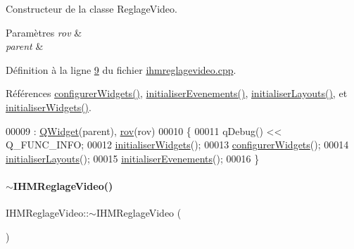 Constructeur de la classe Reglage\+Video. 


\begin{DoxyParams}{Paramètres}
{\em rov} & \\
\hline
{\em parent} & \\
\hline
\end{DoxyParams}


Définition à la ligne \hyperlink{ihmreglagevideo_8cpp_source_l00009}{9} du fichier \hyperlink{ihmreglagevideo_8cpp_source}{ihmreglagevideo.\+cpp}.



Références \hyperlink{ihmreglagevideo_8cpp_source_l00047}{configurer\+Widgets()}, \hyperlink{ihmreglagevideo_8cpp_source_l00105}{initialiser\+Evenements()}, \hyperlink{ihmreglagevideo_8cpp_source_l00061}{initialiser\+Layouts()}, et \hyperlink{ihmreglagevideo_8cpp_source_l00023}{initialiser\+Widgets()}.


\begin{DoxyCode}
00009                                                           : \hyperlink{class_q_widget}{QWidget}(parent), 
      \hyperlink{class_i_h_m_reglage_video_a755736fe361e651453de6bc21725a626}{rov}(rov)
00010 \{
00011     qDebug() << Q\_FUNC\_INFO;
00012     \hyperlink{class_i_h_m_reglage_video_ad41172843e79eae9bb64048ec76b81e6}{initialiserWidgets}();
00013     \hyperlink{class_i_h_m_reglage_video_a2e51529e3a822121ae999e13da2180c6}{configurerWidgets}();
00014     \hyperlink{class_i_h_m_reglage_video_a6efcf5e8c7dfd272ecb1398985f7332a}{initialiserLayouts}();
00015     \hyperlink{class_i_h_m_reglage_video_a4576b1b6ccfcabf6b2b39d37db2dd248}{initialiserEvenements}();    
00016 \}
\end{DoxyCode}
\mbox{\label{class_i_h_m_reglage_video_aaf105e0ca892a751632170a3a083dfec}} 
\paragraph{\texorpdfstring{$\sim$\+I\+H\+M\+Reglage\+Video()}{~IHMReglageVideo()}}
{\footnotesize\ttfamily I\+H\+M\+Reglage\+Video\+::$\sim$\+I\+H\+M\+Reglage\+Video (\begin{DoxyParamCaption}{ }\end{DoxyParamCaption})}



